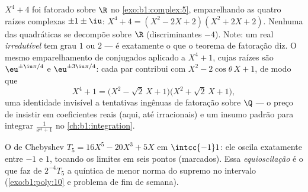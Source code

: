 \begin{example}\label{ex:b1:poly:factorexample}
$X^4 + 4$ foi fatorado sobre $\R$ no \cref{exo:b1:complex:5}, emparelhando
as quatro raízes complexas $\pm 1 \pm \iu$:
$X^4 + 4 = (X^2 - 2X + 2)(X^2 + 2X + 2)$. Nenhuma das quadráticas se decompõe
sobre $\R$ (discriminantes $-4$). Note: um  real
\emph{irredutível} tem grau $1$ ou $2$ --- é exatamente o que o
teorema de fatoração diz. O mesmo emparelhamento de conjugados aplicado a
$X^4 + 1$, cujas raízes são $\eu^{\pm\iu\pi/4}$ e
$\eu^{\pm3\iu\pi/4}$: cada par contribui com $X^2 -
2\cos\theta\,X + 1$, de modo que
\[
X^4 + 1 = \bigl(X^2 - \sqrt2\,X + 1\bigr)
\bigl(X^2 + \sqrt2\,X + 1\bigr) ,
\]
uma identidade invisível a tentativas ingênuas de fatoração sobre $\Q$
--- o preço de insistir em coeficientes reais (aqui, até irracionais)
e um insumo padrão para integrar $\frac1{x^4 +
1}$ no \cref{ch:b1:integration}.
\end{example}

\begin{omfigure}

{\small O  de Chebyshev $T_5 = 16X^5 - 20X^3 + 5X$ em
$\intcc{-1}1$: ele oscila exatamente entre $-1$ e $1$,
tocando os limites em seis pontos (marcados). Essa
\emph{equioscilação} é o que faz de $2^{-4}T_5$ a quíntica
 de menor norma do supremo no intervalo
(\cref{exo:b1:poly:10} e problema de fim de semana).}
\end{omfigure}

